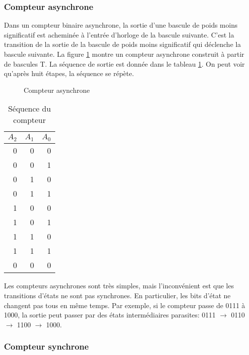 \documentclass[11pt]{article}
\begin{document}
\subsubsection{Compteur asynchrone}
\label{sec:org1e25b93}

Dans un compteur binaire asynchrone, la sortie d'une bascule de poids
moins significatif est acheminée à l'entrée d'horloge de la bascule
suivante. C'est la transition de la sortie de la bascule de poids
moins significatif qui déclenche la bascule suivante. La figure
\ref{fig:org7b56151} montre un compteur asynchrone construit à partir de
bascules T. La séquence de sortie est donnée dans le tableau
\ref{tab:org8fe03fc}. On peut voir qu'après huit étapes, la séquence se
répète.

\begin{figure}[htbp]
\centering

\caption{\label{fig:org7b56151}Compteur asynchrone}
\end{figure}

\begin{table}[htbp]
\caption{\label{tab:org8fe03fc}Séquence du compteur}
\centering
\begin{tabular}{rrr}
\(A_2\) & \(A_1\) & \(A_0\)\\
\hline
0 & 0 & 0\\
0 & 0 & 1\\
0 & 1 & 0\\
0 & 1 & 1\\
1 & 0 & 0\\
1 & 0 & 1\\
1 & 1 & 0\\
1 & 1 & 1\\
0 & 0 & 0\\
\end{tabular}
\end{table}

Les compteurs asynchrones sont très simples, mais l'inconvénient est
que les transitions d'états ne sont pas synchrones. En particulier,
les bits d'état ne changent pas tous en même temps. Par exemple, si le
compteur passe de 0111 à 1000, la sortie peut passer par des états
intermédiaires parasites: 0111 \(\rightarrow\) 0110 \(\rightarrow\) 1100
\(\rightarrow\) 1000.

\subsubsection{Compteur synchrone}
\label{sec:org1a6fbb9}
\end{document}
